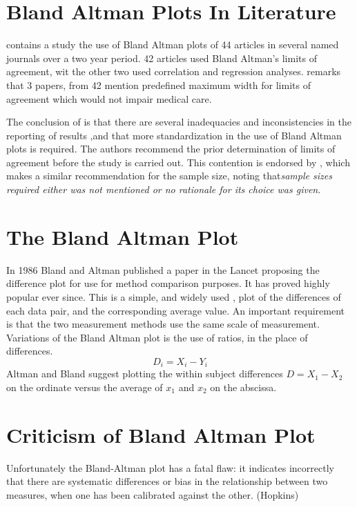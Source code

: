 \documentclass[Chap2main.tex]{subfiles}
\begin{document}
	\section{Bland Altman Plots In Literature}
	\citet{mantha} contains a study the use of Bland Altman plots of 44 articles in several named journals over a two year period. 42
	articles used Bland Altman's limits of agreement, wit the other two used correlation and regression analyses. \citet{mantha}
	remarks that 3 papers, from 42 mention predefined maximum width for limits of agreement which would not impair medical care.
	
	The conclusion of \citet{mantha} is that there are several inadequacies and inconsistencies in the reporting of results ,and
	that more standardization in the use of Bland Altman plots is required. The authors recommend the prior determination of limits
	of agreement before the study is carried out. This contention is endorsed by \citet{lin}, which makes a similar recommendation for
	the sample size, noting that\emph{sample sizes required either was not mentioned or no rationale for its choice was given}.
	\section{The Bland Altman Plot}
	
	In 1986 Bland and Altman published a paper in the Lancet proposing the difference plot for use for method comparison purposes. It has
	proved highly popular ever since. This is a simple, and widely used , plot of the differences of each data pair, and the
	corresponding average value. An important requirement is that the two measurement methods use the same scale of measurement.
	\\
	Variations of the Bland Altman plot is the use of ratios, in the place of differences.
	\begin{equation}
	D_{i} = X_{i} - Y_{i}   \label{BA01}
	\end{equation}
	Altman and Bland suggest plotting the within subject differences $ D = X_{1} - X_{2} $ on the ordinate versus the average of $x_{1}$
	and  $x_{2}$ on the abscissa. 
	\section{Criticism of Bland Altman Plot}
	Unfortunately the Bland-Altman plot has a fatal flaw: it indicates incorrectly that there are systematic differences or bias in the
	relationship between two measures, when one has been calibrated against the other. (Hopkins)
	
\end{document}
